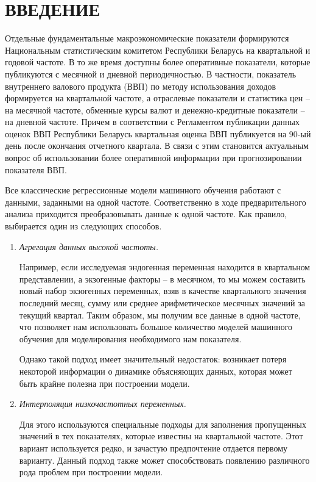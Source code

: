\documentclass[a4paper, 14pt]{extreport}
\numberwithin{equation}{section}
\numberwithin{equation}{section}
\begin{document}
	\chapter*{\centering ВВЕДЕНИЕ}
	Отдельные фундаментальные макроэкономические показатели формируются Национальным статистическим комитетом Республики Беларусь на квартальной и годовой частоте. В то же время доступны более оперативные показатели, которые публикуются с месячной и дневной периодичностью.
	В частности, показатель внутреннего валового продукта (ВВП) по методу использования доходов формируется на квартальной частоте, а отраслевые показатели и статистика цен – на месячной частоте, обменные курсы валют и денежно-кредитные показатели – на дневной частоте. 
	Причем в соответствии с Регламентом публикации данных оценок ВВП Республики Беларусь квартальная оценка ВВП публикуется на 90-ый день после окончания отчетного квартала. В связи с этим становится актуальным вопрос об использовании более оперативной информации при прогнозировании показателя ВВП.
	
	Все классические регрессионные модели машинного обучения работают с данными, заданными на одной частоте.  Соответственно в ходе предварительного анализа приходится преобразовывать данные к одной частоте. Как правило, выбирается один из следующих способов.
	\begin{enumerate}
		\item \textit{Агрегация данных высокой частоты. }
		
		Например, если исследуемая эндогенная переменная находится в квартальном представлении, а экзогенные факторы -- в месячном, то мы можем составить новый набор экзогенных переменных, взяв в качестве квартального значения последний месяц, сумму или среднее арифметическое месячных значений за текущий квартал. Таким образом, мы получим все данные в одной частоте, что позволяет нам использовать большое количество моделей машинного обучения для моделирования необходимого нам показателя.
		
		Однако такой подход имеет значительный недостаток:
		возникает потеря некоторой информации о динамике объясняющих данных, которая может быть крайне полезна при построении модели.
		
		\item \textit{Интерполяция низкочастотных
		переменных.}
		
		Для этого используются специальные подходы для заполнения пропущенных значений в тех показателях, которые известны на квартальной частоте. Этот вариант используется редко, и зачастую предпочтение отдается первому варианту. Данный подход также может способствовать появлению различного рода проблем при построении модели.
	\end{enumerate}
	
\end{document}
